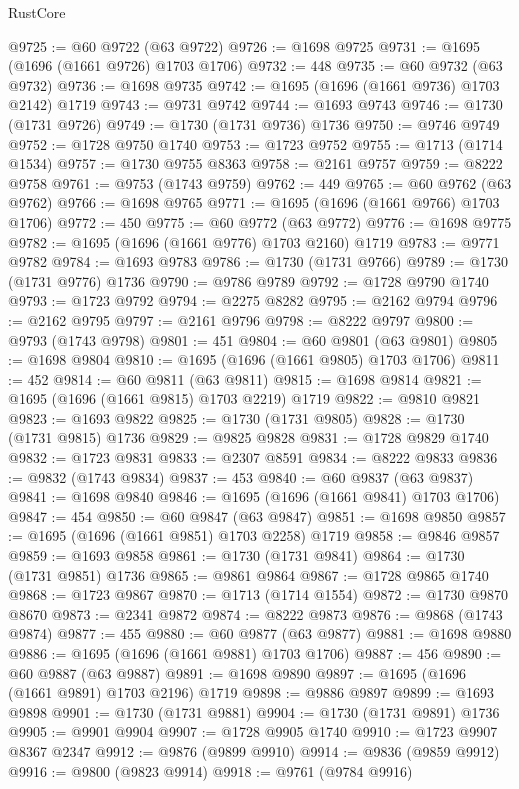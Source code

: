 \begin{lexlean}{RustCore}
\begin{coremodule}
@9725 := @60 @9722 (@63 @9722)
@9726 := @1698 @9725
@9731 := @1695 (@1696 (@1661 @9726) @1703 @1706)
@9732 := 448
@9735 := @60 @9732 (@63 @9732)
@9736 := @1698 @9735
@9742 := @1695 (@1696 (@1661 @9736) @1703 @2142) @1719
@9743 := @9731 @9742
@9744 := @1693 @9743
@9746 := @1730 (@1731 @9726)
@9749 := @1730 (@1731 @9736) @1736
@9750 := @9746 @9749
@9752 := @1728 @9750 @1740
@9753 := @1723 @9752
@9755 := @1713 (@1714 @1534)
@9757 := @1730 @9755 @8363
@9758 := @2161 @9757
@9759 := @8222 @9758
@9761 := @9753 (@1743 @9759)
@9762 := 449
@9765 := @60 @9762 (@63 @9762)
@9766 := @1698 @9765
@9771 := @1695 (@1696 (@1661 @9766) @1703 @1706)
@9772 := 450
@9775 := @60 @9772 (@63 @9772)
@9776 := @1698 @9775
@9782 := @1695 (@1696 (@1661 @9776) @1703 @2160) @1719
@9783 := @9771 @9782
@9784 := @1693 @9783
@9786 := @1730 (@1731 @9766)
@9789 := @1730 (@1731 @9776) @1736
@9790 := @9786 @9789
@9792 := @1728 @9790 @1740
@9793 := @1723 @9792
@9794 := @2275 @8282
@9795 := @2162 @9794
@9796 := @2162 @9795
@9797 := @2161 @9796
@9798 := @8222 @9797
@9800 := @9793 (@1743 @9798)
@9801 := 451
@9804 := @60 @9801 (@63 @9801)
@9805 := @1698 @9804
@9810 := @1695 (@1696 (@1661 @9805) @1703 @1706)
@9811 := 452
@9814 := @60 @9811 (@63 @9811)
@9815 := @1698 @9814
@9821 := @1695 (@1696 (@1661 @9815) @1703 @2219) @1719
@9822 := @9810 @9821
@9823 := @1693 @9822
@9825 := @1730 (@1731 @9805)
@9828 := @1730 (@1731 @9815) @1736
@9829 := @9825 @9828
@9831 := @1728 @9829 @1740
@9832 := @1723 @9831
@9833 := @2307 @8591
@9834 := @8222 @9833
@9836 := @9832 (@1743 @9834)
@9837 := 453
@9840 := @60 @9837 (@63 @9837)
@9841 := @1698 @9840
@9846 := @1695 (@1696 (@1661 @9841) @1703 @1706)
@9847 := 454
@9850 := @60 @9847 (@63 @9847)
@9851 := @1698 @9850
@9857 := @1695 (@1696 (@1661 @9851) @1703 @2258) @1719
@9858 := @9846 @9857
@9859 := @1693 @9858
@9861 := @1730 (@1731 @9841)
@9864 := @1730 (@1731 @9851) @1736
@9865 := @9861 @9864
@9867 := @1728 @9865 @1740
@9868 := @1723 @9867
@9870 := @1713 (@1714 @1554)
@9872 := @1730 @9870 @8670
@9873 := @2341 @9872
@9874 := @8222 @9873
@9876 := @9868 (@1743 @9874)
@9877 := 455
@9880 := @60 @9877 (@63 @9877)
@9881 := @1698 @9880
@9886 := @1695 (@1696 (@1661 @9881) @1703 @1706)
@9887 := 456
@9890 := @60 @9887 (@63 @9887)
@9891 := @1698 @9890
@9897 := @1695 (@1696 (@1661 @9891) @1703 @2196) @1719
@9898 := @9886 @9897
@9899 := @1693 @9898
@9901 := @1730 (@1731 @9881)
@9904 := @1730 (@1731 @9891) @1736
@9905 := @9901 @9904
@9907 := @1728 @9905 @1740
@9910 := @1723 @9907 @8367 @2347
@9912 := @9876 (@9899 @9910)
@9914 := @9836 (@9859 @9912)
@9916 := @9800 (@9823 @9914)
@9918 := @9761 (@9784 @9916)

\end{coremodule}
\end{lexlean}
